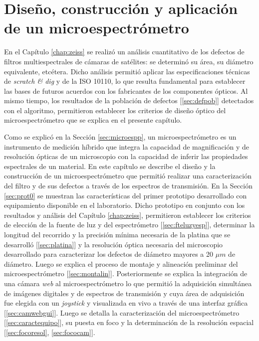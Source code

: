 \singlespacing
\chapter{Diseño, construcción y aplicación de un microespectrómetro}
\label{chap:microsp}

\hspace{0.5cm}En el Capítulo \ref{chap:zeiss} se realizó un análisis cuantitativo de los defectos de filtros multiespectrales de cámaras de satélites: se determinó su área, su diámetro equivalente, etcétera. Dicho análisis permitió aplicar las especificaciones técnicas de \textit{scratch \& dig} y de la ISO 10110, lo que resulta fundamental para establecer las bases de futuros acuerdos con los fabricantes de los componentes ópticos. Al mismo tiempo, los resultados de la población de defectos [\ref{sec:defpob}] detectados con el algoritmo, permitieron establecer los criterios de diseño óptico del microespectrómetro que se explica en el presente capítulo.

Como se explicó en la Sección \ref{sec:microespp}, un microespectrómetro es un instrumento de medición híbrido que integra la capacidad de magnificación y de resolución ópticas de un microscopio con la capacidad de inferir las propiedades espectrales de un material. En este capítulo se describe el diseño y la construcción de un microespectrómetro que permitió realizar una caracterización del filtro y de sus defectos a través de los espectros de transmisión. En la Sección \ref{sec:prot0} se muestran las características del primer prototipo desarrollado con equipamiento disponible en el laboratorio. Dicho prototipo en conjunto con los resultados y análisis del Capítulo \ref{chap:zeiss}, permitieron establecer los criterios de elección de la fuente de luz y del espectrómetro [\ref{sec:fteluzyesp}], determinar la longitud del recorrido y la precisión mínima necesaria de la platina que se desarrolló [\ref{sec:platina}] y la resolución óptica necesaria del microscopio desarrollado para caracterizar los defectos de diámetro mayores a 20 $\mu m$ de diámetro. Luego se explica el proceso de montaje y alineación preliminar del microespectrómetro [\ref{sec:montalin}]. Posteriormente se explica la integración de una cámara \textit{web} al microespectrómetro lo que permitió la adquisición simultánea de imágenes digitales y de espectros de transmisión y cuya área de adquisición fue elegida con un \textit{joystick} y visualizada en vivo a través de una interfaz gráfica [\ref{sec:camwebgui}]. Luego se detalla la caracterización del microespectrómetro [\ref{sec:caractequipo}], su puesta en foco y la determinación de la resolución espacial [\ref{sec:focoresol}, \ref{sec:fococam}].

